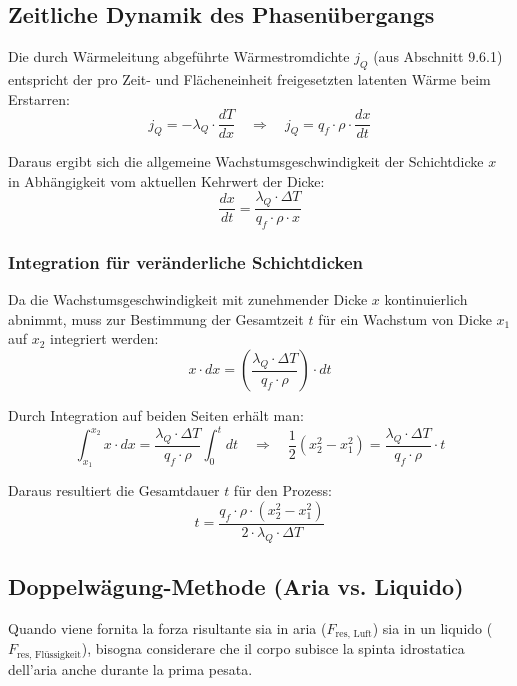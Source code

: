 \subsection{Zeitliche Dynamik des Phasenübergangs }
Die durch Wärmeleitung abgeführte Wärmestromdichte $j_Q$ (aus Abschnitt 9.6.1) entspricht der pro Zeit- und Flächeneinheit freigesetzten latenten Wärme beim Erstarren:
\begin{equation*}
j_Q = -\lambda_Q \cdot \frac{dT}{dx} \quad \Longrightarrow \quad j_Q = q_f \cdot \rho \cdot \frac{dx}{dt}
\end{equation*}

Daraus ergibt sich die allgemeine Wachstumsgeschwindigkeit der Schichtdicke $x$ in Abhängigkeit vom aktuellen Kehrwert der Dicke:
\begin{equation*}
\frac{dx}{dt} = \frac{\lambda_Q \cdot \Delta T}{q_f \cdot \rho \cdot x}
\end{equation*}

\subsubsection{Integration für veränderliche Schichtdicken}
Da die Wachstumsgeschwindigkeit mit zunehmender Dicke $x$ kontinuierlich abnimmt, muss zur Bestimmung der Gesamtzeit $t$ für ein Wachstum von Dicke $x_1$ auf $x_2$ integriert werden:
\begin{equation*}
x \cdot dx = \left( \frac{\lambda_Q \cdot \Delta T}{q_f \cdot \rho} \right) \cdot dt
\end{equation*}

Durch Integration auf beiden Seiten erhält man:
\begin{equation*}
\int_{x_1}^{x_2} x \cdot dx = \frac{\lambda_Q \cdot \Delta T}{q_f \cdot \rho} \int_{0}^{t} dt \quad \Longrightarrow \quad \frac{1}{2}\left(x_2^2 - x_1^2\right) = \frac{\lambda_Q \cdot \Delta T}{q_f \cdot \rho} \cdot t
\end{equation*}

Daraus resultiert die Gesamtdauer $t$ für den Prozess:
\begin{equation*}
t = \frac{q_f \cdot \rho \cdot \left(x_2^2 - x_1^2\right)}{2 \cdot \lambda_Q \cdot \Delta T}
\end{equation*}

\subsection{Doppelwägung-Methode (Aria vs. Liquido)}
Quando viene fornita la forza risultante sia in aria ($F_{\text{res, Luft}}$) sia in un liquido ($F_{\text{res, Flüssigkeit}}$), bisogna considerare che il corpo subisce la spinta idrostatica dell'aria anche durante la prima pesata.


